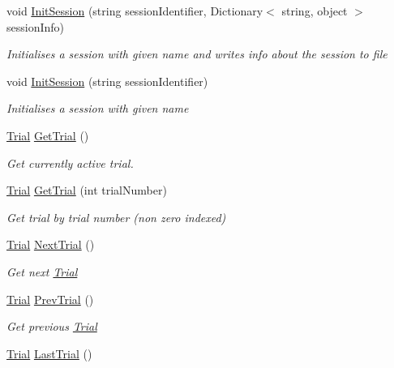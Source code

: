 \begin{DoxyCompactItemize}
void \hyperlink{class_exp_mngr_1_1_experiment_session_a251a75fb62c3fe759e3af6fdfbf8c1ee}{Init\+Session} (string session\+Identifier, Dictionary$<$ string, object $>$ session\+Info)
\begin{DoxyCompactList}\small\item\em Initialises a session with given name and writes info about the session to file \end{DoxyCompactList}\item 
void \hyperlink{class_exp_mngr_1_1_experiment_session_aa97a6a087d184a53ed679e499c3829f7}{Init\+Session} (string session\+Identifier)
\begin{DoxyCompactList}\small\item\em Initialises a session with given name \end{DoxyCompactList}\item 
\hyperlink{class_exp_mngr_1_1_trial}{Trial} \hyperlink{class_exp_mngr_1_1_experiment_session_af4c8f8f7fc233ae747177b8ec7e7ab68}{Get\+Trial} ()
\begin{DoxyCompactList}\small\item\em Get currently active trial. \end{DoxyCompactList}\item 
\hyperlink{class_exp_mngr_1_1_trial}{Trial} \hyperlink{class_exp_mngr_1_1_experiment_session_ae5a59eb1992dfcf48f96cce11a94455e}{Get\+Trial} (int trial\+Number)
\begin{DoxyCompactList}\small\item\em Get trial by trial number (non zero indexed) \end{DoxyCompactList}\item 
\hyperlink{class_exp_mngr_1_1_trial}{Trial} \hyperlink{class_exp_mngr_1_1_experiment_session_a607ca5ace08b787b754c54476069fa00}{Next\+Trial} ()
\begin{DoxyCompactList}\small\item\em Get next \hyperlink{class_exp_mngr_1_1_trial}{Trial} \end{DoxyCompactList}\item 
\hyperlink{class_exp_mngr_1_1_trial}{Trial} \hyperlink{class_exp_mngr_1_1_experiment_session_ae5fe61e3f2d63bd05658655d97d1c17b}{Prev\+Trial} ()
\begin{DoxyCompactList}\small\item\em Get previous \hyperlink{class_exp_mngr_1_1_trial}{Trial} \end{DoxyCompactList}\item 
\hyperlink{class_exp_mngr_1_1_trial}{Trial} \hyperlink{class_exp_mngr_1_1_experiment_session_a7f3fc46b3284c9739f8b1805d23f737a}{Last\+Trial} ()

\end{DoxyCompactItemize}
